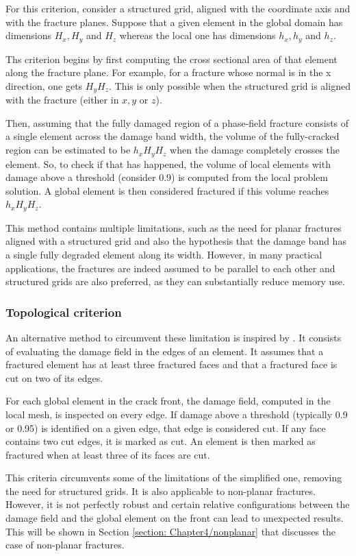For this criterion, consider a structured grid, aligned with the coordinate axis and with the fracture planes. Suppose that a given element in the global domain has dimensions $H_x, H_y$ and $H_z$ whereas the local one has dimensions $h_x, h_y$ and $h_z$.

Ths criterion begins by first computing the cross sectional area of that element along the fracture plane. For example, for a fracture whose normal is in the x direction, one gets $H_yH_z$. This is only possible when the structured grid is aligned with the fracture (either in $x, y$ or $z$).

Then, assuming that the fully damaged region of a phase-field fracture consists of a single element across the damage band width, the volume of the fully-cracked region can be estimated to be $h_xH_yH_z$ when the damage completely crosses the element. So, to check if that has happened, the volume of local elements with damage above a threshold (consider 0.9) is computed from the local problem solution. A global element is then considered fractured if this volume reaches $h_xH_yH_z$.

This method contains multiple limitations, such as the need for planar fractures aligned with a structured grid and also the hypothesis that the damage band has a single fully degraded element along its width. However, in many practical applications, the fractures are indeed assumed to be parallel to each other and structured grids are also preferred, as they can substantially reduce memory use. 

\subsubsection{Topological criterion}

An alternative method to circumvent these limitation is inspired by \cite{muixi2021combined}. It consists of evaluating the damage field in the edges of an element. It assumes that a fractured element has at least three fractured faces and that a fractured face is cut on two of its edges.

For each global element in the crack front, the damage field, computed in the local mesh, is inspected on every edge. If damage above a threshold (typically 0.9 or 0.95) is identified on a given edge, that edge is considered cut. If any face contains two cut edges, it is marked as cut. An element is then marked as fractured when at least three of its faces are cut.

This criteria circumvents some of the limitations of the simplified one, removing the need for structured grids. It is also applicable to non-planar fractures. However, it is not perfectly robust and certain relative configurations between the damage field and the global element on the front can lead to unexpected results. This will be shown in Section \ref{section: Chapter4/nonplanar} that discusses the case of non-planar fractures.
